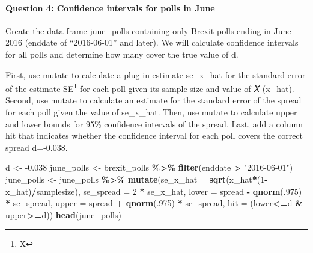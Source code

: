 \documentclass[
]{article}
\newenvironment{Shaded}{\begin{snugshade}}{\end{snugshade}}
\newcommand{\DataTypeTok}[1]{\textcolor[rgb]{0.13,0.29,0.53}{#1}}
\newcommand{\DecValTok}[1]{\textcolor[rgb]{0.00,0.00,0.81}{#1}}
\newcommand{\FloatTok}[1]{\textcolor[rgb]{0.00,0.00,0.81}{#1}}
\newcommand{\KeywordTok}[1]{\textcolor[rgb]{0.13,0.29,0.53}{\textbf{#1}}}
\newcommand{\NormalTok}[1]{#1}
\newcommand{\OperatorTok}[1]{\textcolor[rgb]{0.81,0.36,0.00}{\textbf{#1}}}
\newcommand{\StringTok}[1]{\textcolor[rgb]{0.31,0.60,0.02}{#1}}
\begin{document}
\hypertarget{question-4-confidence-intervals-for-polls-in-june}{%
\paragraph{Question 4: Confidence intervals for polls in
June}\label{question-4-confidence-intervals-for-polls-in-june}}

Create the data frame june\_polls containing only Brexit polls ending in
June 2016 (enddate of ``2016-06-01'' and later). We will calculate
confidence intervals for all polls and determine how many cover the true
value of d.

First, use mutate to calculate a plug-in estimate se\_x\_hat for the
standard error of the estimate SE\footnote{X} for each poll given its
sample size and value of 𝑋̂ (x\_hat). Second, use mutate to calculate an
estimate for the standard error of the spread for each poll given the
value of se\_x\_hat. Then, use mutate to calculate upper and lower
bounds for 95\% confidence intervals of the spread. Last, add a column
hit that indicates whether the confidence interval for each poll covers
the correct spread d=-0.038.

\begin{Shaded}
\begin{Highlighting}[]
\NormalTok{d \textless{}{-}}\StringTok{ }\FloatTok{{-}0.038}
\NormalTok{june\_polls \textless{}{-}}\StringTok{ }\NormalTok{brexit\_polls }\OperatorTok{\%\textgreater{}\%}
\StringTok{  }\KeywordTok{filter}\NormalTok{(enddate }\OperatorTok{\textgreater{}}\StringTok{ "2016{-}06{-}01"}\NormalTok{)}
\NormalTok{june\_polls \textless{}{-}}\StringTok{ }\NormalTok{june\_polls }\OperatorTok{\%\textgreater{}\%}
\StringTok{  }\KeywordTok{mutate}\NormalTok{(}\DataTypeTok{se\_x\_hat =} \KeywordTok{sqrt}\NormalTok{(x\_hat}\OperatorTok{*}\NormalTok{(}\DecValTok{1}\OperatorTok{{-}}\NormalTok{x\_hat)}\OperatorTok{/}\NormalTok{samplesize),}
           \DataTypeTok{se\_spread =} \DecValTok{2} \OperatorTok{*}\StringTok{ }\NormalTok{se\_x\_hat,}
           \DataTypeTok{lower =}\NormalTok{ spread }\OperatorTok{{-}}\StringTok{ }\KeywordTok{qnorm}\NormalTok{(.}\DecValTok{975}\NormalTok{) }\OperatorTok{*}\StringTok{ }\NormalTok{se\_spread,}
           \DataTypeTok{upper =}\NormalTok{ spread }\OperatorTok{+}\StringTok{ }\KeywordTok{qnorm}\NormalTok{(.}\DecValTok{975}\NormalTok{) }\OperatorTok{*}\StringTok{ }\NormalTok{se\_spread,}
           \DataTypeTok{hit =}\NormalTok{ (lower}\OperatorTok{\textless{}=}\NormalTok{d }\OperatorTok{\&}\StringTok{ }\NormalTok{upper}\OperatorTok{\textgreater{}=}\NormalTok{d))}
\KeywordTok{head}\NormalTok{(june\_polls)}
\end{Highlighting}
\end{Shaded}
\end{document}
